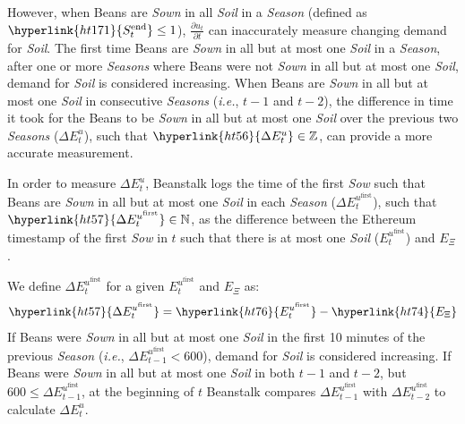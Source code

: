 \documentclass[tikz]{article}
\newcommand{\term}[1]{\textsl{#1}}
\begin{document}
\newpage
However, when Beans are \term{Sown} in all \term{Soil} in a \term{Season} (defined as $\hyperlink{ht171}{S_t^{\text{end}}} \leq 1$), $\frac{\partial u_t}{\partial t}$ can inaccurately measure changing demand for \term{Soil}. The first time Beans are \term{Sown} in all but at most one \term{Soil} in a \term{Season}, after one or more \term{Seasons} where Beans were not \term{Sown} in all but at most one \term{Soil}, demand for \term{Soil} is considered increasing. When Beans are \term{Sown} in all but at most one \term{Soil} in consecutive \term{Seasons} (\term{i.e.}, $t-1$ and $t-2$), the difference in time it took for the Beans to be \term{Sown} in all but at most one \term{Soil} over the previous two \term{Seasons} (\hyperlink{ht56}{$\Delta E_{t}^{u}$}), such that $\hyperlink{ht56}{\Delta E_{t}^{u}} \in \mathbb{Z}$, can provide a more accurate measurement. 

In order to measure \hyperlink{ht56}{$\Delta E_{t}^{u}$}, Beanstalk logs the time of the first \term{Sow} such that Beans are \term{Sown} in all but at most one \term{Soil} in each \term{Season} (\hyperlink{ht57}{$\Delta E_{t}^{u^{\text{first}}}$}), such that $\hyperlink{ht57}{\Delta E_{t}^{u^{\text{first}}}} \in \mathbb{N}$, as the difference between the Ethereum timestamp of the first \term{Sow} in \hyperlink{ht204}{$t$} such that there is at most one \term{Soil} (\hyperlink{ht76}{$E_{t}^{u^{\text{first}}}$}) and \hyperlink{ht74}{$E_\Xi$}. 

We define \hyperlink{ht57}{$\Delta E_{t}^{u^{\text{first}}}$} for a given \hyperlink{ht76}{$E_{t}^{u^{\text{first}}}$} and \hyperlink{ht74}{$E_\Xi$} as:
$$\hyperlink{ht57}{\Delta E_{t}^{u^{\text{first}}}} = \hyperlink{ht76}{E_{t}^{u^{\text{first}}}} - \hyperlink{ht74}{E_\Xi}$$
If Beans were \term{Sown} in all but at most one \term{Soil} in the first 10 minutes of the previous \term{Season} (\term{i.e.}, $\Delta E_{t-1}^{u^{\text{first}}} < 600$), demand for \term{Soil} is considered increasing. If Beans were \term{Sown} in all but at most one \term{Soil} in both $t-1$ and $t-2$, but $600 \leq \Delta E_{t-1}^{u^{\text{first}}}$, at the beginning of \hyperlink{ht204}{$t$} Beanstalk compares $\Delta E_{t-1}^{u^{\text{first}}}$ with $\Delta E_{t-2}^{u^{\text{first}}}$ to calculate \hyperlink{ht56}{$\Delta E_{t}^{u}$}.
\end{document}
